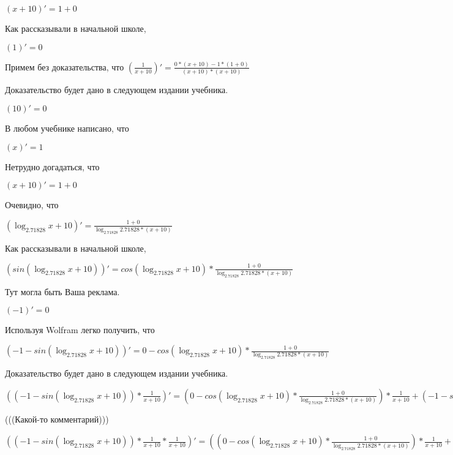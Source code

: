 \documentclass[12pt,a4paper,fleqn]{article}
\theoremstyle{definition}
\begin{document}
$( x  +  10 )' =  1  +  0 $

Как рассказывали в начальной школе,

$( 1 )' =  0 $

Примем без доказательства, что
$(\frac{ 1 }{ x  +  10 }
)' = \frac{ 0  * ( x  +  10 ) -  1  * ( 1  +  0 )}{( x  +  10 ) * ( x  +  10 )}
$

Доказательство будет дано в следующем издании учебника.

$( 10 )' =  0 $

В любом учебнике написано, что

$( x )' =  1 $

Нетрудно догадаться, что

$( x  +  10 )' =  1  +  0 $

Очевидно, что

$(\log_{ 2.71828 }{ x  +  10 })' = \frac{ 1  +  0 }{\log_{ 2.71828 }{ 2.71828 } * ( x  +  10 )}
$

Как рассказывали в начальной школе,

$(sin(\log_{ 2.71828 }{ x  +  10 }))' = cos(\log_{ 2.71828 }{ x  +  10 }) * \frac{ 1  +  0 }{\log_{ 2.71828 }{ 2.71828 } * ( x  +  10 )}
$

Тут могла быть Ваша реклама.

$( -1 )' =  0 $

Используя Wolfram легко получить, что

$( -1  - sin(\log_{ 2.71828 }{ x  +  10 }))' =  0  - cos(\log_{ 2.71828 }{ x  +  10 }) * \frac{ 1  +  0 }{\log_{ 2.71828 }{ 2.71828 } * ( x  +  10 )}
$

Доказательство будет дано в следующем издании учебника.

$(( -1  - sin(\log_{ 2.71828 }{ x  +  10 })) * \frac{ 1 }{ x  +  10 }
)' = ( 0  - cos(\log_{ 2.71828 }{ x  +  10 }) * \frac{ 1  +  0 }{\log_{ 2.71828 }{ 2.71828 } * ( x  +  10 )}
) * \frac{ 1 }{ x  +  10 }
 + ( -1  - sin(\log_{ 2.71828 }{ x  +  10 })) * \frac{ 0  * ( x  +  10 ) -  1  * ( 1  +  0 )}{( x  +  10 ) * ( x  +  10 )}
$

(((Какой-то комментарий)))

$(( -1  - sin(\log_{ 2.71828 }{ x  +  10 })) * \frac{ 1 }{ x  +  10 }
 * \frac{ 1 }{ x  +  10 }
)' = (( 0  - cos(\log_{ 2.71828 }{ x  +  10 }) * \frac{ 1  +  0 }{\log_{ 2.71828 }{ 2.71828 } * ( x  +  10 )}
) * \frac{ 1 }{ x  +  10 }
 + ( -1  - sin(\log_{ 2.71828 }{ x  +  10 })) * \frac{ 0  * ( x  +  10 ) -  1  * ( 1  +  0 )}{( x  +  10 ) * ( x  +  10 )}
) * \frac{ 1 }{ x  +  10 }
 + ( -1  - sin(\log_{ 2.71828 }{ x  +  10 })) * \frac{ 1 }{ x  +  10 }
 * \frac{ 0  * ( x  +  10 ) -  1  * ( 1  +  0 )}{( x  +  10 ) * ( x  +  10 )}
$
\end{document}
